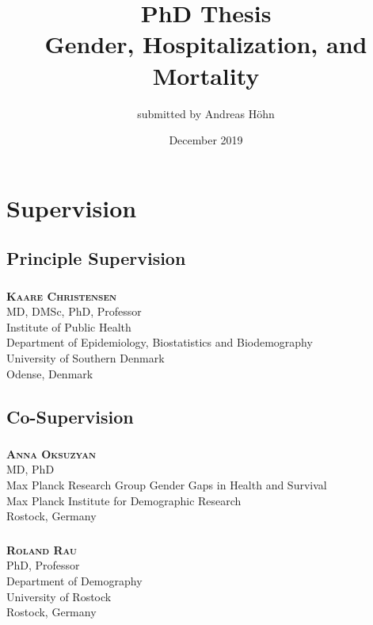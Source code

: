 \documentclass[oneside,bibliography=totocnumbered]{scrbook}
\title{PhD Thesis \\ \vspace{0.25in} Gender, Hospitalization, and Mortality}
\author{submitted by Andreas H\"ohn}
\date{December 2019}
\begin{document}
\maketitle

\frontmatter




\chapter*{Supervision}

\vspace{0.25in}

\section*{Principle Supervision}
\subsection*{}
\textbf{\textsc{Kaare Christensen}}								\\	
MD, DMSc, PhD, Professor										\\
Institute of Public Health										\\ 
Department of Epidemiology, Biostatistics and Biodemography	 	\\
University of Southern Denmark									\\
Odense, Denmark					

\vspace{0.25in}

\section*{Co-Supervision}
\subsection*{}
\textbf{\textsc{Anna Oksuzyan}}									\\
MD, PhD															\\ 			
Max Planck Research Group Gender Gaps in Health and Survival	\\
Max Planck Institute for Demographic Research					\\
Rostock, Germany												

\subsection*{}										
\textbf{\textsc{Roland Rau}}									\\
PhD, Professor													\\
Department of Demography										\\
University of Rostock											\\
Rostock, Germany	
\end{document}
